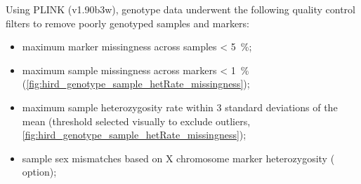Using PLINK (v1.90b3w), genotype data underwent the following quality control filters to remove poorly genotyped samples and markers:
\begin{itemize}
    \item maximum marker missingness across samples \SI{< 5}{\percent};
    \item maximum sample missingness across markers \SI{< 1}{\percent} (\cref{fig:hird_genotype_sample_hetRate_missingness});
    \item maximum sample heterozygosity rate within 3 standard deviations of the mean (threshold selected visually to exclude outliers, \cref{fig:hird_genotype_sample_hetRate_missingness});
    \item sample sex mismatches based on X chromosome marker heterozygosity ( option);

\end{itemize}
